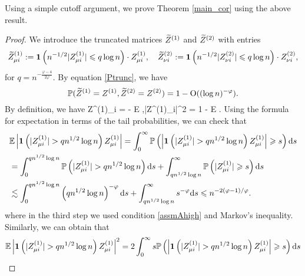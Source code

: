 Using a simple cutoff argument, we prove Theorem \ref{main_cor} using the above result.
\begin{proof}%
We introduce the truncated matrices $\widetilde Z^{(1)}$ and $\widetilde Z^{(2)}$ with entries
$$ \widetilde Z^{(1)}_{\mu i}:= \mathbf 1\left( n^{-1/2}|Z^{(1)}_{\mu i}|\leqslant q \log n \right)\cdot Z^{(1)}_{\mu i}, \quad \widetilde Z^{(2)}_{\nu i}:= \mathbf 1\left( n^{-1/2}|Z^{(2)}_{\nu i}|\leqslant q \log n \right)\cdot Z^{(2)}_{\nu i}, $$
for $q= n^{-\frac{\varphi - 4}{2\varphi}}$. By equation \eqref{Ptrunc}, 
we have
\begin{equation}\label{XneX}
\mathbb P(\widetilde Z^{(1)} = Z^{(1)},  \widetilde Z^{(2)} = Z^{(2)}) =1-\operatorname{O} ( (\log n)^{-\varphi}).
\end{equation}
By definition, we have 
\be\label{EwtZ}\E  \wt  Z^{(1)}_{\mu i} = - \mathbb E  ,\quad \E  |\wt  Z^{(1)}_{\mu i}|^2 = 1 - \mathbb E  .\ee
Using the formula for expectation in terms of the tail probabilities, we can check that
\begin{align*}
&  \mathbb E \left| \mathbf 1\left( |Z^{(1)}_{\mu i}|> q n^{1/2}\log n \right)Z^{(1)}_{\mu i}\right| = \int_0^\infty \P\left( \left| \mathbf 1\left(  |Z^{(1)}_{\mu i}|> q n^{1/2}\log n \right)Z^{(1)}_{\mu i}\right| \ge s\right)\dd s \\
&  = \int_0^{qn^{1/2}\log n}\P\left( |Z^{(1)}_{\mu i}|> q  n^{1/2}\log n \right)\dd s +\int_{qn^{1/2}\log n}^\infty \P\left(|Z^{(1)}_{\mu i}| \ge s\right)\dd s  \\
&\lesssim \int_0^{qn^{1/2}\log n}\left(q  n^{1/2}\log n \right)^{-\varphi}\dd s +\int_{qn^{1/2}\log n}^\infty s^{-\varphi}\dd s \le n^{-2(\varphi-1)/\varphi}.
\end{align*}
where in the third step we used condition \eqref{assmAhigh} and Markov's inequality. Similarly, we can obtain that 
\begin{align*}
&  \mathbb E \left| \mathbf 1\left( |Z^{(1)}_{\mu i}|> qn^{1/2} \log n \right)Z^{(1)}_{\mu i}\right|^2 = 2\int_0^\infty s \P\left( \left| \mathbf 1\left( |Z^{(1)}_{\mu i}|> q n^{1/2}\log n \right)Z^{(1)}_{\mu i}\right| \ge s\right)\dd s \\

\end{align*}
\end{proof}
